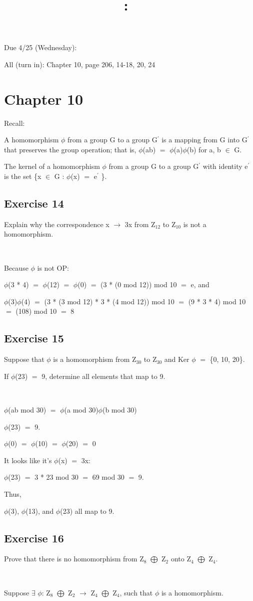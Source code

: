 \documentclass{article}
\title{
    \vspace{2in}
    \textmd{\textbf{\hmwkClass:\ \hmwkTitle}}\\
    \normalsize\vspace{0.1in}\small\vspace{0.1in}\large{\textit{\hmwkClassInstructor}}
    \vspace{3in}
}
\author{\hmwkAuthorName}
\date{}
\newcommand{\mt}[1]{\ensuremath{#1}}
\newcommand\bsc[2][\DefaultOpt]{%
  \def\DefaultOpt{#2}%
  \section[#1]{#2}%
}
\newcommand\ssc[2][\DefaultOpt]{%
  \def\DefaultOpt{#2}%
  \subsection[#1]{#2}%
}
\newcommand{\mem}{\mt{\in} }
\newcommand{\exs}{\mt{\exists} }
\newcommand{\lra}{ \mt{\longrightarrow} } %
\newcommand{\bk}[1]{\{#1\}}
\newcommand{\eql}{\mt{=} }
\newcommand{\pr}{\mt{^\prime} } 		   %
\newcommand{\uw}[2]{#1\mt{_{#2}}}
\newcommand{\edp}{\mt{\bigoplus} }
\begin{document}
Due 4/25 (Wednesday):

All (turn in): Chapter 10, page 206, 14-18, 20, 24

\bsc{Chapter 10}{

Recall: 

A homomorphism $\phi$ from a group G to a group G\pr is a mapping from G into G\pr that preserves the group operation; that is, $\phi$(ab) \eql $\phi$(a)$\phi$(b) for a, b \mem G.

The kernel of a homomorphism $\phi$ from a group G to a group G\pr with identity e\pr is the set \bk{x \mem G : $\phi$(x) \eql e\pr}.

\ssc{Exercise 14}{

Explain why the correspondence x \lra 3x from \uw{Z}{12} to \uw{Z}{10} is not a homomorphism.

\

Because $\phi$ is not OP:

$\phi$(3 * 4) \eql $\phi$(12) \eql $\phi$(0) \eql (3 * (0 mod 12)) mod 10 \eql e, and

$\phi$(3)$\phi$(4) \eql (3 * (3 mod 12) * 3 * (4 mod 12)) mod 10 \eql (9 * 3 * 4) mod 10 \eql (108) mod 10 \eql 8

}

\ssc{Exercise 15}{

Suppose that $\phi$ is a homomorphism from \uw{Z}{30} to \uw{Z}{30} and Ker $\phi$ \eql \bk{0, 10, 20}.

If $\phi$(23) \eql 9, determine all elements that map to 9.

\

$\phi$(ab mod 30) \eql $\phi$(a mod 30)$\phi$(b mod 30)

$\phi$(23) \eql 9.

$\phi$(0) \eql $\phi$(10) \eql $\phi$(20) \eql 0

It looks like it's $\phi$(x) \eql 3x:

$\phi$(23) \eql 3 * 23 mod 30 \eql 69 mod 30 \eql 9.

Thus,

$\phi$(3), $\phi$(13), and $\phi$(23) all map to 9.

}

\ssc{Exercise 16}{

Prove that there is no homomorphism from \uw{Z}{8} \edp \uw{Z}{2} onto \uw{Z}{4} \edp \uw{Z}{4}.

\

Suppose \exs $\phi$: \uw{Z}{8} \edp \uw{Z}{2} \lra \uw{Z}{4} \edp \uw{Z}{4}, such that $\phi$ is a homomorphism.

}}
\end{document}
